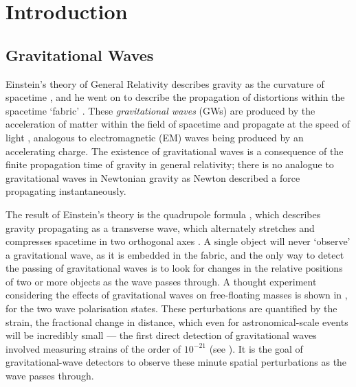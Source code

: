 
\chapter{Introduction}
\label{chap:intro}


\chaptoc{}


\section{Gravitational Waves}
\label{sec:gw}


\begin{colsection}

Einstein's theory of General Relativity describes gravity as the curvature of spacetime \citep{Einstein1914}, and he went on to describe the propagation of distortions within the spacetime `fabric' \citep{Einstein1916}. These \emph{gravitational waves} (GWs)  are produced by the acceleration of matter within the field of spacetime and propagate at the speed of light \citep{GW170817_gravity}, analogous to electromagnetic (EM)  waves being produced by an accelerating charge. The existence of gravitational waves is a consequence of the finite propagation time of gravity in general relativity; there is no analogue to gravitational waves in Newtonian gravity as Newton described a force propagating instantaneously.

The result of Einstein's theory is the quadrupole formula \citep{Einstein1916}, which describes gravity propagating as a transverse wave, which alternately stretches and compresses spacetime in two orthogonal axes \citep{BIGcardiff}. A single object will never `observe' a gravitational wave, as it is embedded in the fabric, and the only way to detect the passing of gravitational waves is to look for changes in the relative positions of two or more objects as the wave passes through. A thought experiment considering the effects of gravitational waves on free-floating masses is shown in , for the two wave polarisation states. These perturbations are quantified by the strain, the fractional change in distance, which even for astronomical-scale events will be incredibly small --- the first direct detection of gravitational waves involved measuring strains of the order of $10^{-21}$ (see ). It is the goal of gravitational-wave detectors to observe these minute spatial perturbations as the wave passes through.


\end{colsection}
